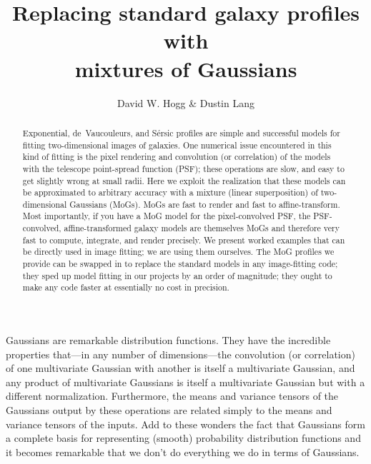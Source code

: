 \documentclass[12pt,pdftex,preprint]{aastex}
\begin{document}
\title{Replacing standard galaxy profiles with \\ mixtures of Gaussians}
\author{David W. Hogg \&
        Dustin Lang}

\begin{abstract}
Exponential, de~Vaucouleurs, and S\'ersic profiles are simple and
successful models for fitting two-dimensional images of galaxies.  One
numerical issue encountered in this kind of fitting is the pixel
rendering and convolution (or correlation) of the models with the
telescope point-spread function (PSF); these operations are slow, and
easy to get slightly wrong at small radii.  Here we exploit the
realization that these models can be approximated to arbitrary
accuracy with a mixture (linear superposition) of two-dimensional
Gaussians (MoGs).  MoGs are fast to render and fast to
affine-transform.  Most importantly, if you have a MoG model for the
pixel-convolved PSF, the PSF-convolved, affine-transformed galaxy
models are themselves MoGs and therefore very fast to compute,
integrate, and render precisely.  We present worked examples that can
be directly used in image fitting; we are using them ourselves.  The
MoG profiles we provide can be swapped in to replace the standard
models in any image-fitting code; they sped up model fitting in our
projects by an order of magnitude; they ought to make any code faster
at essentially no cost in precision.
\end{abstract}

Gaussians are remarkable distribution functions.  They have the
incredible properties that---in any number of dimensions---the
convolution (or correlation) of one multivariate Gaussian with another
is itself a multivariate Gaussian, and any product of multivariate
Gaussians is itself a multivariate Gaussian but with a different
normalization.  Furthermore, the means and variance tensors of the
Gaussians output by these operations are related simply to the means
and variance tensors of the inputs.  Add to these wonders the fact
that Gaussians form a complete basis for representing (smooth)
probability distribution functions and it becomes remarkable that we
don't do everything we do in terms of Gaussians.
\end{document}
